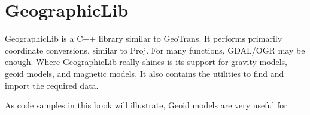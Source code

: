 %


\section*{GeographicLib}

GeographicLib is a C++ library similar to GeoTrans.  It performs primarily coordinate conversions,
similar to Proj.  For many functions, GDAL/OGR may be enough.  Where GeographicLib really shines is
its support for gravity models, geoid models, and magnetic models.  It also contains the utilities to 
find and import the required data.

As code samples in this book will illustrate, Geoid models are very useful for 

